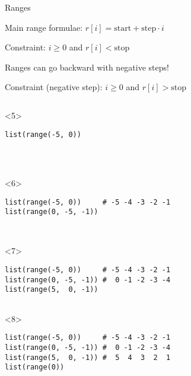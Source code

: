 \begin{frame}[fragile]{Ranges}

   Main range formulae: $ r[i] = \text{start} + \text{step} \cdot i $

   Constraint: $ i \geq 0 $ and $ r[i] < \text{stop} $

   Ranges can go backward with negative steps!

   Constraint (negative step): $ i \geq 0 $ and $ r[i] > \text{stop} $

  \medskip

  \begin{center}

  \begin{columns}[onlytextwidth]
    \begin{column}{\textwidth}

      \begin{onlyenv}<5>
        \begin{lstlisting}[style=python,morekeywords={for, in, range, list}]
list(range(-5, 0))




 \end{lstlisting}
      \end{onlyenv}

      \begin{onlyenv}<6>
        \begin{lstlisting}[style=python,morekeywords={for, in, range, list}]
list(range(-5, 0))     # -5 -4 -3 -2 -1
list(range(0, -5, -1))



 \end{lstlisting}
      \end{onlyenv}

      \begin{onlyenv}<7>
        \begin{lstlisting}[style=python,morekeywords={for, in, range, list}]
list(range(-5, 0))     # -5 -4 -3 -2 -1
list(range(0, -5, -1)) #  0 -1 -2 -3 -4
list(range(5,  0, -1))


 \end{lstlisting}
      \end{onlyenv}

      \begin{onlyenv}<8>
        \begin{lstlisting}[style=python,morekeywords={for, in, range, list}]
list(range(-5, 0))     # -5 -4 -3 -2 -1
list(range(0, -5, -1)) #  0 -1 -2 -3 -4
list(range(5,  0, -1)) #  5  4  3  2  1
list(range(0))


\end{lstlisting}
\end{onlyenv}
\end{column}
\end{columns}
\end{center}
\end{frame}
